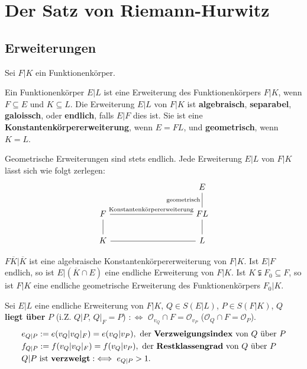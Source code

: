 
\chapter{Der Satz von Riemann-Hurwitz}

\section{Erweiterungen}
Sei $F|K$ ein Funktionenkörper.

\begin{definition}
    Ein Funktionenkörper $E|L$ ist eine Erweiterung des Funktionenkörpers $F|K$, wenn $F \subseteq E$ und $K \subseteq L$.
    Die Erweiterung $E|L$ von $F|K$ ist \textbf{algebraisch}, \textbf{separabel}, \textbf{galoissch}, oder \textbf{endlich}, falls
    $E|F$ dies ist. Sie ist eine \textbf{Konstantenkörpererweiterung}, wenn $E = FL$, und \textbf{geometrisch}, wenn $K=L$.
\end{definition}

\begin{bemerkungnr}
    Geometrische Erweiterungen sind stets endlich. Jede Erweiterung $E|L$ von $F|K$ lässt sich wie folgt zerlegen:
    $$\begin{tikzcd}[column sep=10em]
          & E\\
        F \rar[dash]{\text{Konstantenkörpererweiterung}} & FL \uar[dash]{\text{geometrisch}}\\
        K \rar[dash] \uar[dash] & L \uar[dash]
    \end{tikzcd}$$
\end{bemerkungnr}

\begin{beispiel}
    $F\overline{K}|\overline{K}$ ist eine algebraische Konstantenkörpererweiterung von $F|K$.
    Ist $E|F$ endlich, so ist $E|(\overline{K}\cap E)$ eine endliche Erweiterung von $F|K$.
    Ist $K \subsetneqq F_0 \subseteq F$, so ist $F|K$ eine endliche geometrische Erweiterung des Funktionenkörpers $F_0|K$.
\end{beispiel}

\begin{definition}
    Sei $E|L$ eine endliche Erweiterung von $F|K$, $Q \in S(E|L)$, $P \in S(F|K)$, $Q$ \textbf{liegt über} $P$ 
    (i.Z. $Q|P$, $Q|_F = P$) $: \iff$ $\mathcal{O}_{v_Q} \cap F = \mathcal{O}_{v_P}$ ($\mathcal{O}_Q \cap F = \mathcal{O}_P$).
    \begin{align*}
        &e_{Q|P} := e(v_Q | v_Q|_F) = e(v_Q | v_P), \text{ der \textbf{Verzweigungsindex} von } Q \text{ über } P\\
        &f_{Q|P} := f(v_Q | v_Q|_F) = f(v_Q | v_P), \text{ der \textbf{Restklassengrad} von } Q \text{ über } P\\
        &Q|P \text{ ist \textbf{verzweigt}} :\iff e_{Q|P} > 1.
    \end{align*}
\end{definition}

